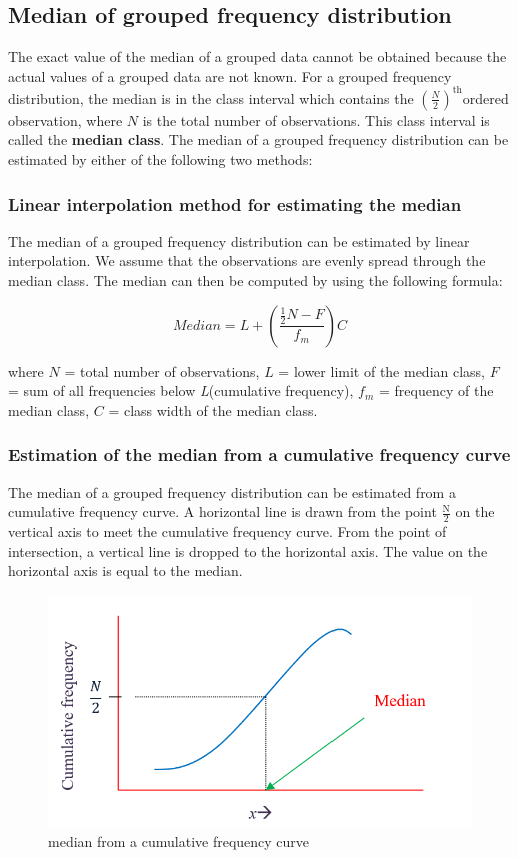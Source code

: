\documentclass[
]{book}
\begin{document}
\subsection{Median of grouped frequency distribution}\label{median-of-grouped-frequency-distribution}

The exact value of the median of a grouped data cannot be obtained
because the actual values of a grouped data are not known. For a grouped
frequency distribution, the median is in the class interval which
contains the \(\left( \frac{N}{2} \right)^{\text{th}}\)ordered
observation, where \(N\) is the total number of observations. This class
interval is called the \textbf{median class}. The median of a grouped
frequency distribution can be estimated by either of the following two
methods:

\subsubsection{Linear interpolation method for estimating the median}\label{linear-interpolation-method-for-estimating-the-median}

The median of a grouped frequency distribution can be estimated by
linear interpolation. We assume that the observations are evenly spread
through the median class. The median can then be computed by using the
following formula:

\[Median = L + \left( \frac{\frac{1}{2}N - F}{f_{m}} \right)C\]

where \(N\) = total number of observations, \(L\) = lower limit of the
median class, \(F\) = sum of all frequencies below \emph{L}(cumulative
frequency), \(f_{m}\) = frequency of the median class, \(C\) = class width
of the median class.

\subsubsection{Estimation of the median from a cumulative frequency curve}\label{estimation-of-the-median-from-a-cumulative-frequency-curve}

The median of a grouped frequency distribution can be estimated from a
cumulative frequency curve. A horizontal line is drawn from the point
\(\frac{\text{N}}{2}\) on the vertical axis to meet the cumulative
frequency curve. From the point of intersection, a vertical line is
dropped to the horizontal axis. The value on the horizontal axis is
equal to the median.

\begin{figure}

{\centering \includegraphics[width=0.5\linewidth]{images/mediancf} 

}

\caption{median from a cumulative frequency curve }\label{fig:mediancf}
\end{figure}
\end{document}
